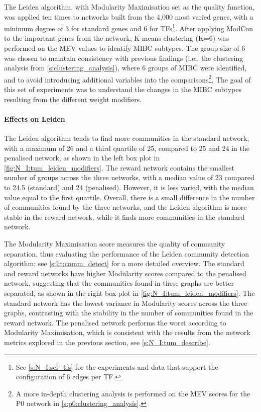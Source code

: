 The Leiden algorithm, with Modularity Maximisation set as the quality function, was applied ten times to networks built from the 4,000 most varied genes, with a minimum degree of 3 for standard genes and 6 for TFs\footnote{See \cref{s:N_I:sel_tfs} for the experiments and data that support the configuration of 6 edges per TF.}. After applying ModCon to the important genes from the network, K-means clustering (K=6) was performed on the MEV values to identify MIBC subtypes. The group size of 6 was chosen to maintain consistency with previous findings (i.e., the clustering analysis from \cref{s:clustering_analysis}), where 6 groups of MIBC were identified, and to avoid introducing additional variables into the comparisons\footnote{A more in-depth clustering analysis is performed on the MEV scores for the P0 network in \cref{s:p0:clustering_analysis}.}. The goal of this set of experiments was to understand the changes in the MIBC subtypes resulting from the different weight modifiers.


\paragraph*{Effects on Leiden}
The Leiden algorithm tends to find more communities in the standard network, with a maximum of 26 and a third quartile of 25, compared to 25 and 24 in the penalised network, as shown in the left box plot in \cref{fig:N_I:tum_leiden_modifiers}. The reward network contains the smallest number of groups across the three networks, with a median value of 23 compared to 24.5 (standard) and 24 (penalised). However, it is less varied, with the median value equal to the first quartile. Overall, there is a small difference in the number of communities found by the three networks, and the Leiden algorithm is more stable in the reward network, while it finds more communities in the standard network.

The Modularity Maximisation score measures the quality of community separation, thus evaluating the performance of the Leiden community detection algorithm; see \cref{s:lit:comm_detect} for a more detailed overview. The standard and reward networks have higher Modularity scores compared to the penalised network, suggesting that the communities found in these graphs are better separated, as shown in the right box plot in \cref{fig:N_I:tum_leiden_modifiers}. The standard network has the lowest variance in Modularity scores across the three graphs, contrasting with the stability in the number of communities found in the reward network. The penalised network performs the worst according to Modularity Maximisation, which is consistent with the results from the network metrics explored in the previous section, see \cref{s:N_I:tum_describe}.

